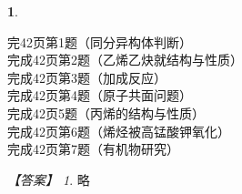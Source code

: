 \documentclass[UTF8, 10pt, a4paper, oneside]{ctexart}
\newcommand{\fs}[1]{{\fangsong #1}}%
\theoremstyle{definition}
\newtheorem{subexercise}{}[exercise]%
\theoremstyle{remark}
\newtheorem*{answer}{【答案】}
\theoremstyle{plain}
\begin{document}
\setcounter{subexercise}{0}
\addtocounter{exercise}{1}
\begin{subexercise}
    \begin{multicols}{2}
        \noindent 完42页第1题（同分异构体判断）\\
        完成42页第2题（乙烯乙炔就结构与性质）\\
        完成42页第3题（加成反应）\\
        完成42页第4题（原子共面问题）\\
        完成42页5题（丙烯的结构与性质）\\
        完成42页第6题（烯烃被高锰酸钾氧化）\\
        完成42页第7题（有机物研究）
    \end{multicols}
    \begin{answer}
        \fs{略}
    \end{answer}
\end{subexercise}
\end{document}

